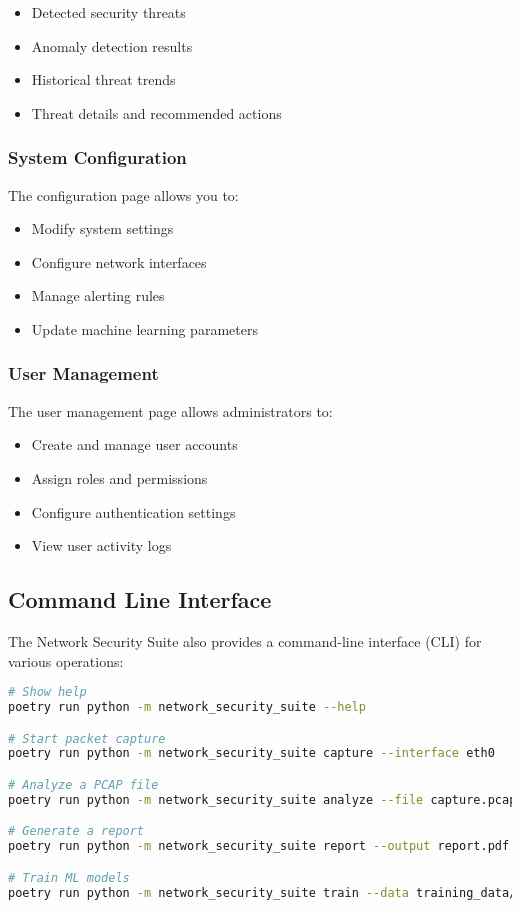 \begin{itemize}
    \item Detected security threats
    \item Anomaly detection results
    \item Historical threat trends
    \item Threat details and recommended actions
\end{itemize}

\subsubsection{System Configuration}
The configuration page allows you to:

\begin{itemize}
    \item Modify system settings
    \item Configure network interfaces
    \item Manage alerting rules
    \item Update machine learning parameters
\end{itemize}

\subsubsection{User Management}
The user management page allows administrators to:

\begin{itemize}
    \item Create and manage user accounts
    \item Assign roles and permissions
    \item Configure authentication settings
    \item View user activity logs
\end{itemize}

\subsection{Command Line Interface}
The Network Security Suite also provides a command-line interface (CLI) for various operations:

\begin{lstlisting}[language=bash, caption=CLI Examples]
# Show help
poetry run python -m network_security_suite --help

# Start packet capture
poetry run python -m network_security_suite capture --interface eth0

# Analyze a PCAP file
poetry run python -m network_security_suite analyze --file capture.pcap

# Generate a report
poetry run python -m network_security_suite report --output report.pdf

# Train ML models
poetry run python -m network_security_suite train --data training_data/
\end{lstlisting}

